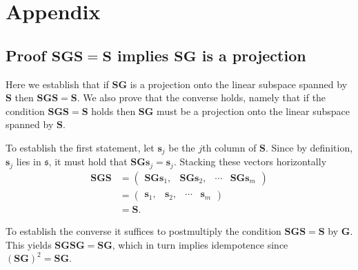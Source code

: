 \documentclass[12pt]{article}
\theoremstyle{definition}
\begin{document}
\clearpage
\appendix

\section{Appendix}

\subsection{Proof $\bm{S}\bm{G}\bm{S}=\bm{S}$ implies $\bm{S}\bm{G}$ is a projection}\label{app:projection-proof}

Here we establish that if $\bm{S}\bm{G}$ is a projection onto the linear subspace spanned by $\bm{S}$ then $\bm{S}\bm{G}\bm{S}=\bm{S}$. We also prove that the converse holds, namely that if the condition $\bm{S}\bm{G}\bm{S}=\bm{S}$ holds then $\bm{S}\bm{G}$ must be a projection onto the linear subspace spanned by $\bm{S}$.

To establish the first statement, let $\bm{s}_j$ be the $j$th column of $\bm{S}$. Since by definition, $\bm{s}_j$ lies in $\mathfrak{s}$, it must hold that $\bm{S}\bm{G}\bm{s}_j=\bm{s}_j$. Stacking these vectors horizontally
\begin{align*}
\bm{S}\bm{G}\bm{S}
  & = \begin{pmatrix}
        \bm{S}\bm{G}\bm{s}_1, & \bm{S}\bm{G}\bm{s}_2, & \cdots & \bm{S}\bm{G}\bm{s}_m
      \end{pmatrix} \\
  & = \begin{pmatrix}
        \bm{s}_1, & \bm{s}_2, & \cdots & \bm{s}_m
      \end{pmatrix}\\
  & = \bm{S}.
\end{align*}

To establish the converse it suffices to postmultiply the condition $\bm{S}\bm{G}\bm{S}=\bm{S}$ by $\bm{G}$. This yields $\bm{S}\bm{G}\bm{S}\bm{G}=\bm{S}\bm{G}$, which in turn implies idempotence since $(\bm{S}\bm{G})^2=\bm{S}\bm{G}$.


\newpage




\end{document}

